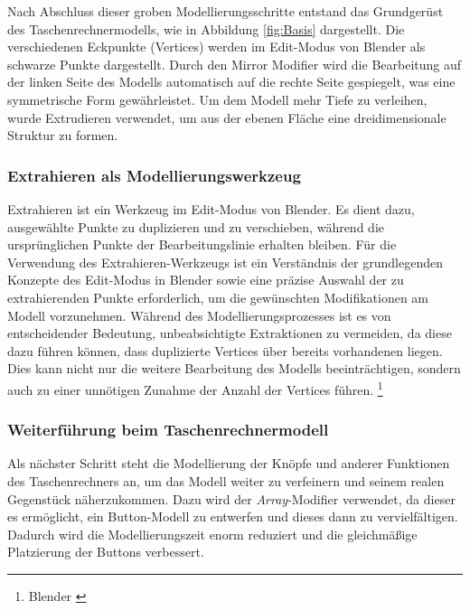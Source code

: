 Nach Abschluss dieser groben Modellierungsschritte entstand das Grundgerüst des Taschenrechnermodells, wie in
Abbildung \ref{fig:Basis} dargestellt. Die verschiedenen Eckpunkte (Vertices) werden im Edit-Modus von Blender als
schwarze Punkte dargestellt. Durch den Mirror Modifier wird die Bearbeitung auf der linken Seite des Modells
automatisch auf die rechte Seite gespiegelt, was eine symmetrische Form gewährleistet. Um dem Modell mehr Tiefe zu
verleihen, wurde Extrudieren verwendet, um aus der ebenen Fläche eine dreidimensionale Struktur zu formen.

\subsubsection*{Extrahieren als Modellierungswerkzeug}
Extrahieren ist ein Werkzeug im Edit-Modus von Blender. Es dient dazu, ausgewählte Punkte zu duplizieren und zu verschieben,
während die ursprünglichen Punkte der Bearbeitungslinie erhalten bleiben.
Für die Verwendung des Extrahieren-Werkzeugs ist ein Verständnis der grundlegenden Konzepte des Edit-Modus in Blender
sowie eine präzise Auswahl der zu extrahierenden Punkte erforderlich, um die gewünschten Modifikationen am Modell
vorzunehmen. Während des Modellierungsprozesses ist es von entscheidender Bedeutung, unbeabsichtigte Extraktionen zu
vermeiden, da diese dazu führen können, dass duplizierte Vertices über bereits vorhandenen liegen. Dies kann nicht
nur die weitere Bearbeitung des Modells beeinträchtigen, sondern auch zu einer unnötigen Zunahme der Anzahl der
Vertices führen. \footnote{Blender \cite{Extrahieren}}

\subsubsection*{Weiterführung beim Taschenrechnermodell}
Als nächster Schritt steht die Modellierung der Knöpfe und anderer Funktionen des Taschenrechners an, um das Modell
weiter zu verfeinern und seinem realen Gegenstück näherzukommen. Dazu wird der \textit{Array}-Modifier verwendet, da
dieser es ermöglicht, ein Button-Modell zu entwerfen und dieses dann zu vervielfältigen. Dadurch wird die
Modellierungszeit enorm reduziert und die gleichmäßige Platzierung der Buttons verbessert.

